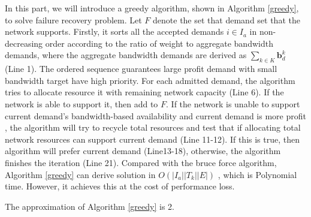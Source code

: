 \documentclass[sigconf]{acmart}
\begin{document}
\begin{appendices}
 In this part, we will introduce a greedy algorithm, shown in Algorithm \ref{greedy}, to solve failure recovery problem.
 Let $F$ denote the set that demand set that the network supports.
Firstly, it sorts all the accepted demands  $i\in I_a$ in non-decreasing order according to the ratio of weight to aggregate bandwidth demands, where the aggregate bandwidth demands are derived as ${\sum_{k\in K}\mathbf{b}^k_d}$ (Line 1).
The ordered sequence guarantees large profit demand with small bandwidth target have high priority.
For each admitted demand, the algorithm tries to allocate resource it with remaining network capacity (Line 6).
If the network is able to support it, then add to $F$.
If the network is unable to support current demand's  bandwidth-based availability and current demand is more profit ,  the algorithm will try to recycle total resources and test that if allocating total network resources can support current demand  (Line 11-12).
If this is true, then algorithm will prefer current demand  (Line13-18), otherwise, the algorithm finishes the iteration (Line 21).
%
Compared with the bruce force algorithm, Algorithm \ref{greedy} can derive solution in $O(|I_a||T_k||E|)$ , which is Polynomial time.
However, it achieves this at the cost of performance loss.
\begin{lemma}\label{greedy-app}
The approximation of Algorithm \ref{greedy} is 2.
\end{lemma}


\end{appendices}
\end{document}
